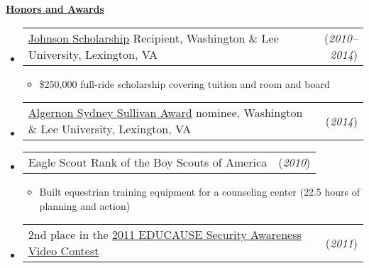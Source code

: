 \documentclass[11pt, letterpaper]{letter}
\makeatletter
\newlength{\indwidth}            \setlength{\indwidth}{\textwidth-.4in}
\newlength{\listSpacing}         \setlength{\listSpacing}{.0375in}
\newlength{\sectionSpacing}      \setlength{\sectionSpacing}{-1pt}
\newlength{\headerAntispace}     \setlength{\headerAntispace}{-6pt}
\newlength{\subListAntispace}    \setlength{\subListAntispace}{-.25in}
\newlength{\subListEndAntispace} \setlength{\subListEndAntispace}{-.075in}
\newcommand{\lst}[1]{
	\vspace{\subListAntispace}
	\begin{itemize}
		\item #1
	\end{itemize}
	\vspace{\subListEndAntispace}
}
\newcommand{\dated}[2]{
	\begin{tabular*}{\indwidth}{l@{\extracolsep{\fill}}r}
		#1 & (\textit{#2})
	\end{tabular*}
}
\newcommand \myul[3]{
	\begingroup
		\renewcommand \ULdepth {#1}
		\renewcommand \ULthickness {#2}
		\uline{#3}
	\endgroup
}
\newcommand \sectionheader[1]{
	\myul{2.7pt}{0.5pt}{\large \textbf{#1}}
}
\makeatother
\begin{document}
\vspace{\sectionSpacing}


\sectionheader{Honors and Awards}
\vspace{\headerAntispace}
\begin{itemize}
	\setlength{\itemsep}{\listSpacing}
	\item \dated{\href{http://go.wlu.edu/johnson}{Johnson Scholarship} Recipient,
	Washington \& Lee University, Lexington, VA}{2010--2014}
	\lst{
		\$250,000 full-ride scholarship covering tuition and room and board
	}
	\item \dated{
		\href{https://www.wlu.edu/university-registrar/policies-and-procedures/university-honors-board/sullivan-award}
		{Algernon Sydney Sullivan Award} nominee, Washington \& Lee University,
		Lexington, VA
	}{2014}
	\item \dated{Eagle Scout Rank of the Boy Scouts of America}{2010}
	\lst{
		Built equestrian training equipment for a counseling center (22.5 hours of planning and action)
	}
	\iftoggle{deanslist}{\item \dated{Dean's Academic Honor List at Washington \&
		Lee University}{2011}}{}
	\iftoggle{leesummer}{\item \dated{Robert E. Lee Research Scholars Program
		Participant}{2011}
		\iftoggle{leesummerdesc}{\lst{
			Deployed a \href{http://www.htcondorproject.org/}{Condor} supercomputing/HTC
			cluster on my university's campus
		}}{}
	}{}
	\item \dated{
		2nd place in the
		\href{https://library.educause.edu/resources/2006/1/information-security-awareness-video-and-poster-contest-winners}
		{2011 EDUCAUSE Security Awareness Video Contest}
	}{2011}
	\iftoggle{questiefinalist}{\item \dated{
		\href{https://www.questbridge.org/}{QuestBridge} National College Match
		Scholarship Finalist
	}{2009}}{\vspace{-7pt}}
	\iftoggle{ossmscholar}{\item \dated{
		OSSM Computer Science Scholar Award
	}{2009}}{\vspace{-7pt}}
\end{itemize}

\vspace{\sectionSpacing}
\end{document}
